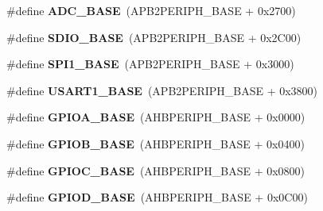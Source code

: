 \begin{DoxyCompactItemize}
\item 
\hypertarget{group___peripheral__memory__map_gad06cb9e5985bd216a376f26f22303cd6}{\#define {\bfseries A\-D\-C\-\_\-\-B\-A\-S\-E}~(A\-P\-B2\-P\-E\-R\-I\-P\-H\-\_\-\-B\-A\-S\-E + 0x2700)}\label{group___peripheral__memory__map_gad06cb9e5985bd216a376f26f22303cd6}

\item 
\hypertarget{group___peripheral__memory__map_ga95dd0abbc6767893b4b02935fa846f52}{\#define {\bfseries S\-D\-I\-O\-\_\-\-B\-A\-S\-E}~(A\-P\-B2\-P\-E\-R\-I\-P\-H\-\_\-\-B\-A\-S\-E + 0x2\-C00)}\label{group___peripheral__memory__map_ga95dd0abbc6767893b4b02935fa846f52}

\item 
\hypertarget{group___peripheral__memory__map_ga50cd8b47929f18b05efbd0f41253bf8d}{\#define {\bfseries S\-P\-I1\-\_\-\-B\-A\-S\-E}~(A\-P\-B2\-P\-E\-R\-I\-P\-H\-\_\-\-B\-A\-S\-E + 0x3000)}\label{group___peripheral__memory__map_ga50cd8b47929f18b05efbd0f41253bf8d}

\item 
\hypertarget{group___peripheral__memory__map_ga86162ab3f740db9026c1320d46938b4d}{\#define {\bfseries U\-S\-A\-R\-T1\-\_\-\-B\-A\-S\-E}~(A\-P\-B2\-P\-E\-R\-I\-P\-H\-\_\-\-B\-A\-S\-E + 0x3800)}\label{group___peripheral__memory__map_ga86162ab3f740db9026c1320d46938b4d}

\item 
\hypertarget{group___peripheral__memory__map_gad7723846cc5db8e43a44d78cf21f6efa}{\#define {\bfseries G\-P\-I\-O\-A\-\_\-\-B\-A\-S\-E}~(A\-H\-B\-P\-E\-R\-I\-P\-H\-\_\-\-B\-A\-S\-E + 0x0000)}\label{group___peripheral__memory__map_gad7723846cc5db8e43a44d78cf21f6efa}

\item 
\hypertarget{group___peripheral__memory__map_gac944a89eb789000ece920c0f89cb6a68}{\#define {\bfseries G\-P\-I\-O\-B\-\_\-\-B\-A\-S\-E}~(A\-H\-B\-P\-E\-R\-I\-P\-H\-\_\-\-B\-A\-S\-E + 0x0400)}\label{group___peripheral__memory__map_gac944a89eb789000ece920c0f89cb6a68}

\item 
\hypertarget{group___peripheral__memory__map_ga26f267dc35338eef219544c51f1e6b3f}{\#define {\bfseries G\-P\-I\-O\-C\-\_\-\-B\-A\-S\-E}~(A\-H\-B\-P\-E\-R\-I\-P\-H\-\_\-\-B\-A\-S\-E + 0x0800)}\label{group___peripheral__memory__map_ga26f267dc35338eef219544c51f1e6b3f}

\item 
\hypertarget{group___peripheral__memory__map_ga1a93ab27129f04064089616910c296ec}{\#define {\bfseries G\-P\-I\-O\-D\-\_\-\-B\-A\-S\-E}~(A\-H\-B\-P\-E\-R\-I\-P\-H\-\_\-\-B\-A\-S\-E + 0x0\-C00)}\label{group___peripheral__memory__map_ga1a93ab27129f04064089616910c296ec}


\end{DoxyCompactItemize}
